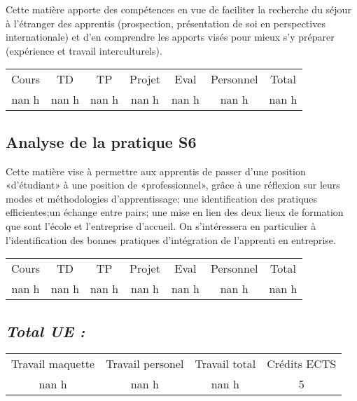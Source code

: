 %
Cette matière apporte des compétences en vue de faciliter la recherche du séjour à l'étranger des apprentis (prospection, présentation de soi en perspectives internationale) et d'en comprendre les apports visés pour mieux s'y préparer (expérience et travail interculturels).%
\begin{longtable}{c c c c c c c}%
\hline%
Cours&TD&TP&Projet&Eval&Personnel&Total\\%
nan h&nan h&nan h&nan h&nan h&nan h&nan h\\%
\hline%
\end{longtable}%
\subsection{Analyse de la pratique S6}%
\label{subsec:AnalysedelapratiqueS6}%

%
Cette matière vise à permettre aux apprentis de passer d’une position «d’étudiant» à une position de «professionnel», grâce à une réflexion sur leurs modes et méthodologies d’apprentissage; une identification des pratiques efficientes;un échange entre pairs; une mise en lien des deux lieux de formation que sont l’école et l’entreprise d’accueil. On s'intéressera en particulier à l'identification des bonnes pratiques d'intégration de l’apprenti en entreprise.%
\begin{longtable}{c c c c c c c}%
\hline%
Cours&TD&TP&Projet&Eval&Personnel&Total\\%
nan h&nan h&nan h&nan h&nan h&nan h&nan h\\%
\hline%
\end{longtable}%
\subsection{\textit{Total UE :}}%
\label{subsec:textitTotalUE}%

%
\begin{longtable}{c c c c}%
\hline%
Travail maquette&Travail personel&Travail total&Crédits ECTS\\%
nan h&nan h&nan h&5\\%
\hline%
\end{longtable}